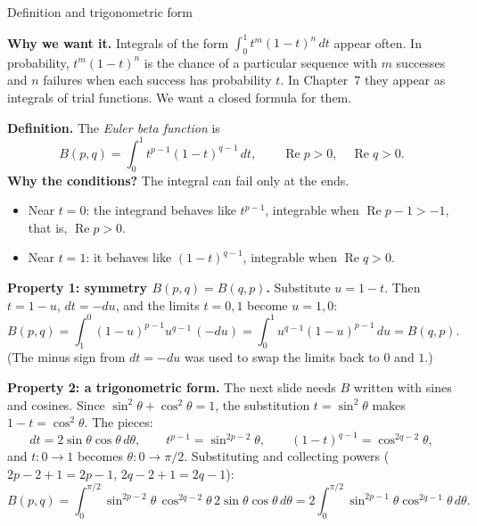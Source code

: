 \documentclass[11pt]{beamer}
\begin{document}
\begin{frame}[allowframebreaks=1.00]{Definition and trigonometric form}
\footnotesize

\textbf{Why we want it.} Integrals of the form \(\int_0^1 t^m(1-t)^n\,dt\) appear often. In
probability, \(t^m(1-t)^n\) is the chance of a particular sequence with \(m\) successes and \(n\)
failures when each success has probability \(t\). In Chapter~7 they appear as integrals of trial
functions. We want a closed formula for them.

\textbf{Definition.} The \emph{Euler beta function} is
\begin{equation}
  B(p,q)
   =\int_0^1 t^{p-1}(1-t)^{q-1}\,dt,
  \qquad
  \operatorname{Re}p>0,\quad \operatorname{Re}q>0.
  \label{eq:beta-def}
\end{equation}
\textbf{Why the conditions?} The integral can fail only at the ends.
\begin{itemize}
  \item Near \(t=0\): the integrand behaves like \(t^{p-1}\), integrable when
        \(\operatorname{Re}p-1>-1\), that is, \(\operatorname{Re}p>0\).
  \item Near \(t=1\): it behaves like \((1-t)^{q-1}\), integrable when \(\operatorname{Re}q>0\).
\end{itemize}
\par\framebreak\par
\textbf{Property 1: symmetry \(B(p,q)=B(q,p)\).} Substitute \(u=1-t\). Then \(t=1-u\),
\(dt=-du\), and the limits \(t=0,1\) become \(u=1,0\):
\[
 B(p,q)=\int_1^0(1-u)^{p-1}u^{q-1}\,(-du)=\int_0^1u^{q-1}(1-u)^{p-1}\,du=B(q,p).
\]
(The minus sign from \(dt=-du\) was used to swap the limits back to \(0\) and \(1\).)

\textbf{Property 2: a trigonometric form.} The next slide needs \(B\) written with sines and
cosines. Since \(\sin^2\theta+\cos^2\theta=1\), the substitution \(t=\sin^2\theta\) makes
\(1-t=\cos^2\theta\). The pieces:
\[
 dt=2\sin\theta\cos\theta\,d\theta,\qquad
 t^{p-1}=\sin^{2p-2}\theta,\qquad
 (1-t)^{q-1}=\cos^{2q-2}\theta,
\]
and \(t:0\to1\) becomes \(\theta:0\to\pi/2\). Substituting and collecting powers
(\(2p-2+1=2p-1\), \(2q-2+1=2q-1\)):
\begin{equation}
  B(p,q)
   =\int_0^{\pi/2}
      \sin^{2p-2}\theta\,
      \cos^{2q-2}\theta\,
      2\sin\theta\cos\theta\,d\theta
   =2\int_0^{\pi/2}
      \sin^{2p-1}\theta
      \cos^{2q-1}\theta\,d\theta.
  \label{eq:beta-trig}
\end{equation}
\end{frame}
\end{document}
